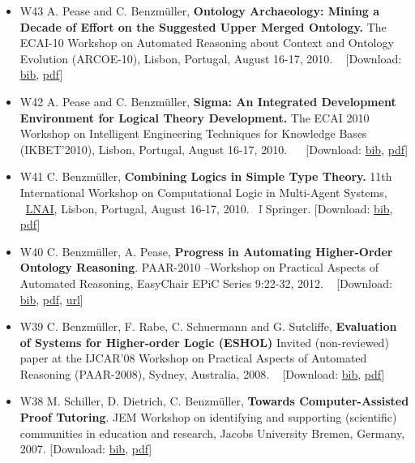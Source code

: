 \documentclass{article}
\newcommand{\tmstrong}[1]{\textbf{#1}}
\newenvironment{itemizedot}{\begin{itemize} \renewcommand{\labelitemi}{$\bullet$}\renewcommand{\labelitemii}{$\bullet$}\renewcommand{\labelitemiii}{$\bullet$}\renewcommand{\labelitemiv}{$\bullet$}}{\end{itemize}}
\begin{document}
\begin{itemizedot}
  \item [W43] A. Pease and C. Benzm\"uller, {\tmstrong{Ontology Archaeology:
  Mining a Decade of Effort on the Suggested Upper Merged Ontology.}} The
  ECAI-10 Workshop on Automated Reasoning about Context and Ontology Evolution
  (ARCOE-10), Lisbon, Portugal, August 16-17, 2010. \ {\color{grey} [Download:
  {\small \href{../papers/W43.bib}{bib}}, {\small
  \href{../papers/W43.pdf}{pdf}}]}
  
  \item [W42] A. Pease and C. Benzm\"uller, {\tmstrong{Sigma: An Integrated
  Development Environment for Logical Theory Development.}} The ECAI 2010
  Workshop on Intelligent Engineering Techniques for Knowledge Bases
  (IKBET'2010), Lisbon, Portugal, August 16-17, 2010. \ \ {\color{grey}
  [Download: {\small \href{../papers/W42.bib}{bib}}, {\small
  \href{../papers/W42.pdf}{pdf}}]}
  
  \item [W41] C. Benzm\"uller, {\tmstrong{Combining Logics in Simple Type
  Theory.}} 11th International Workshop on Computational Logic in Multi-Agent
  Systems, \ \href{http://www.springer.de/comp/lncs/}{LNAI}, Lisbon, Portugal,
  August 16-17, 2010. \ \v{l}  Springer. {\color{grey} [Download: {\small
  \href{../papers/W41.bib}{bib}}, {\small \href{../papers/W41.pdf}{pdf}}]}
  
  \item [W40] C. Benzm\"uller, A. Pease, {\tmstrong{Progress in Automating
  Higher-Order Ontology Reasoning}}. PAAR-2010 --Workshop on Practical Aspects
  of Automated Reasoning, EasyC{\tmstrong{}}hair EPiC Series 9:22-32,
  2012{\tmstrong{}}. \ {\color{grey} [Download: {\small
  \href{../papers/W40.bib}{bib}, \href{../papers/W40.pdf}{pdf}}, {\small
  \href{http://www.easychair.org/publications/?page=999569486}{url}}]}
  
  \item [W39] C. Benzm\"uller, F. Rabe, C. Schuermann and G. Sutcliffe,
  {\tmstrong{Evaluation of Systems for Higher-order Logic (ESHOL)}} Invited
  (non-reviewed) paper at the IJCAR'08 Workshop on Practical Aspects of
  Automated Reasoning (PAAR-2008), Sydney, Australia, 2008. \ {\color{grey}
  [Download: {\small \href{../papers/W39.bib}{bib},
  \href{../papers/W39.pdf}{pdf}}]}
  
  \item [W38] M. Schiller, D. Dietrich, C. Benzm\"uller, {\tmstrong{Towards
  Computer-Assisted Proof Tutoring}}. JEM Workshop on identifying and
  supporting (scientific) communities in education and research, Jacobs
  University Bremen, Germany, 2007. {\color{grey} [Download: {\small
  \href{../papers/W38.bib}{bib}, \href{../papers/W38.pdf}{pdf}}]}
  

\end{itemizedot}
\end{document}
